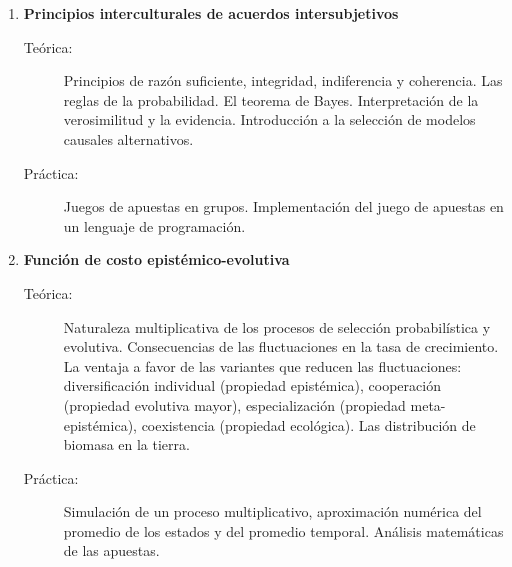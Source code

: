 \documentclass[10pt]{article}
\begin{document}
\begin{enumerate}

\item \textbf{Principios interculturales de acuerdos intersubjetivos} 
\vspace{-0.15cm}
\begin{description}
\item[Teórica:] Principios de razón suficiente, integridad, indiferencia y coherencia. Las reglas de la probabilidad. El teorema de Bayes. Interpretación de la verosimilitud y la evidencia. Introducción a la selección de modelos causales alternativos.
\item[Práctica:] Juegos de apuestas en grupos. Implementación del juego de apuestas en un lenguaje de programación.
\end{description}

\vspace{0.1cm}
\item \textbf{Función de costo epistémico-evolutiva}
\vspace{-0.15cm}
\begin{description}
\item[Teórica:] Naturaleza multiplicativa de los procesos de selección probabilística y evolutiva. Consecuencias de las fluctuaciones en la tasa de crecimiento. La ventaja a favor de las variantes que reducen las fluctuaciones: diversificación individual (propiedad epistémica), cooperación (propiedad evolutiva mayor), especialización (propiedad meta-epistémica), coexistencia (propiedad ecológica). Las distribución de biomasa en la tierra.
\item[Práctica:] Simulación de un proceso multiplicativo, aproximación numérica del promedio de los estados y del promedio temporal. Análisis matemáticas de las apuestas.
\end{description}



\end{enumerate}
\end{document}
